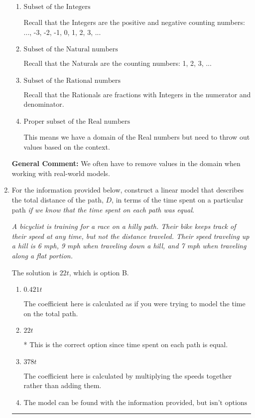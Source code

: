 \documentclass{extbook}[14pt]
\newcommand{\litem}[1]{\item #1

\rule{\textwidth}{0.4pt}}
\begin{document}
\begin{enumerate}
{\begin{enumerate}[label=\Alph*.]
This means we have a domain of the Real numbers and we don't need to remove any values even in the real-world context.
\item \( \text{Subset of the Integers} \)

Recall that the Integers are the positive and negative counting numbers: ..., -3, -2, -1, 0, 1, 2, 3, ... 
\item \( \text{Subset of the Natural numbers} \)

Recall that the Naturals are the counting numbers: 1, 2, 3, ...
\item \( \text{Subset of the Rational numbers} \)

Recall that the Rationals are fractions with Integers in the numerator and denominator.
\item \( \text{Proper subset of the Real numbers} \)

This means we have a domain of the Real numbers but need to throw out values based on the context.
\end{enumerate}

\textbf{General Comment:} We often have to remove values in the domain when working with real-world models.
}
\litem{
For the information provided below, construct a linear model that describes the total distance of the path, $D$, in terms of the time spent on a particular path \textit{if we know that the time spent on each path was equal}.

\begin{center}
    \textit{ A bicyclist is training for a race on a hilly path. Their bike keeps track of their speed at any time, but not the distance traveled. Their speed traveling up a hill is 6 mph, 9 mph when traveling down a hill, and 7 mph when traveling along a flat portion. }
\end{center}
The solution is \( 22 t \), which is option B.\begin{enumerate}[label=\Alph*.]
\item \( 0.421 t \)

The coefficient here is calculated as if you were trying to model the time on the total path.
\item \( 22 t \)

* This is the correct option since time spent on each path is equal.
\item \( 378 t \)

The coefficient here is calculated by multiplying the speeds together rather than adding them.
\item \( \text{The model can be found with the information provided, but isn't options 1-3.} \)


\end{enumerate}}
\end{enumerate}
\end{document}
